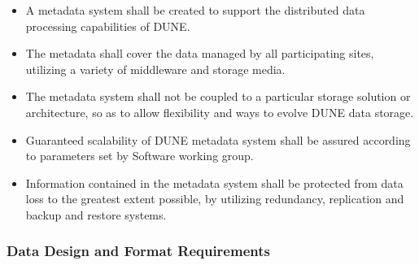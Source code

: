 \begin{itemize}
\item A metadata system shall be created to support the distributed data processing capabilities of DUNE.

\item The metadata shall cover the data managed by all participating sites, utilizing a variety of middleware and storage media.

\item The metadata system shall not be coupled to a particular storage solution or architecture, so as to allow flexibility and ways to evolve DUNE data storage.

\item Guaranteed scalability of DUNE metadata system shall be assured according to parameters set by Software working group.

\item Information contained in the metadata system shall be protected from data loss to the greatest extent possible, by utilizing redundancy, replication and backup and restore systems.

\end{itemize}

\subsubsection{Data Design and Format Requirements}

